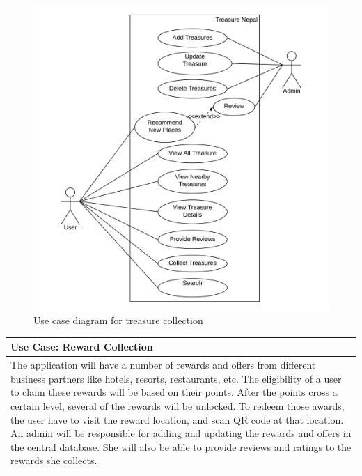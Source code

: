 \documentclass[12pt, a4paper, oneside]{article}
\begin{document}
\begin{figure}[H]
\includegraphics[width=\linewidth]{use-case-diagrams/treasure.png}
\centering
\caption{Use case diagram for treasure collection}
\label{fig:use-case-treasure}
\end{figure}

\vspace{200px}

\begin{table}[H]
\centering
\begin{tabularx}{\linewidth}{|X|} 
\hline
\textbf{Use Case:  Reward Collection}\\ 
\hline
The application will have a number of rewards and offers from different business partners like hotels, resorts, restaurants, etc. The eligibility of a user to claim these rewards will be based on their points. After the points cross a certain level, several of the rewards will be unlocked. To redeem those awards, the user have to visit the reward location, and scan QR code at that location. An admin will be responsible for adding and updating the rewards and offers in the central database. She will also be able to provide reviews and ratings to the rewards she collects.\\
\hline
\end{tabularx}
\end{table}
\end{document}
